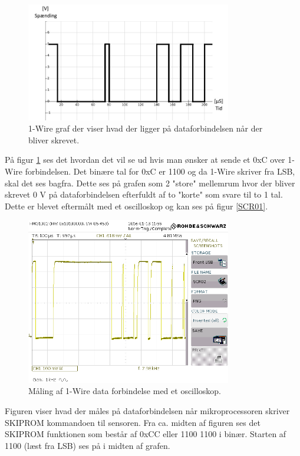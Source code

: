 \begin{figure}[h!]
  \centering
  \includegraphics[width=0.8\textwidth]{figures/onewire.png}
  \caption{1-Wire graf der viser hvad der ligger på dataforbindelsen når der bliver skrevet.}
  \label{onewire_graph}
\end{figure}

På figur \ref{onewire_graph} ses det hvordan det vil se ud hvis man ønsker at sende et 0xC over 1-Wire forbindelsen. Det binære tal for 0xC er 1100 og da 1-Wire skriver fra LSB, skal det ses bagfra. Dette ses på grafen som 2 "store" mellemrum hvor der bliver skrevet 0 V på dataforbindelsen efterfuldt af to "korte" som svare til to 1 tal. Dette er blevet eftermålt med et oscilloskop og kan ses på figur \ref{SCR01}.


\begin{figure}[h!]
  \centering
  \includegraphics[width=0.8\textwidth]{figures/SCR02.png}
  \caption{Måling af 1-Wire data forbindelse med et oscilloskop.}
  \label{SCR02}
\end{figure}

Figuren viser hvad der måles på dataforbindelsen når mikroprocessoren skriver SKIPROM kommandoen til sensoren.
Fra ca. midten af figuren ses det SKIPROM funktionen som består af 0xCC eller 1100 1100 i binær. Starten af 1100 (læst fra LSB) ses på i midten af grafen.


